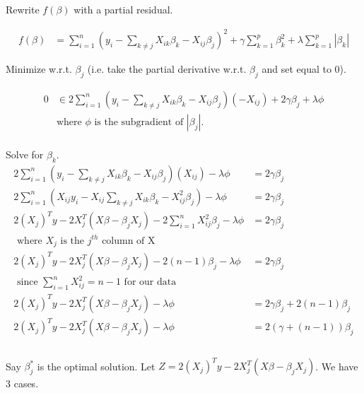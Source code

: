 \documentclass[12pt, reqno]{amsart}
\theoremstyle{definition}
\theoremstyle{remark}
\begin{document}
Rewrite $f(\beta)$ with a partial residual.

\begin{equation*}
\begin{split}
f(\beta) &= \sum_{i = 1}^{n} (y_i - \sum_{k \neq j}^{} X_{ik} \beta_k - X_{ij} \beta_j )^2 + \gamma \sum_{k = 1}^{p} \beta_k^2 + \lambda \sum_{k = 1}^{p} |\beta_k|
\end{split}
\end{equation*}

Minimize w.r.t. $\beta_j$ (i.e. take the partial derivative w.r.t. $\beta_j$ and set equal to $0$).

\begin{equation*}
\begin{split}
0 &\in 2 \sum_{i = 1}^{n} (y_i - \sum_{k \neq j}^{} X_{ik} \beta_k - X_{ij} \beta_j )(-X_{ij}) + 2 \gamma \beta_j + \lambda \phi \\
 & \text{where $\phi$ is the subgradient of $|\beta_j|$.}\\
\end{split}
\end{equation*}


Solve for $\beta_k$.\\
\begin{equation*}
\begin{split}
2 \sum_{i = 1}^{n} (y_i - \sum_{k \neq j}^{} X_{ik} \beta_k - X_{ij} \beta_j )(X_{ij})  - \lambda \phi &= 2 \gamma \beta_j\\
2 \sum_{i = 1}^{n} (X_{ij}y_i - X_{ij}\sum_{k \neq j}^{} X_{ik} \beta_k - X_{ij}^2 \beta_j )  - \lambda \phi &= 2 \gamma \beta_j\\
2 (X_j)^T y - 2 X_j^T (X \beta - \beta_j X_j) - 2\sum_{i = 1}^{n} X_{ij}^2 \beta_j  - \lambda \phi &= 2 \gamma \beta_j\\
\text{ where $X_j$ is the $j^{th}$ column of X} & \\
2 (X_j)^T y - 2 X_j^T (X \beta - \beta_j X_j) - 2(n-1) \beta_j  - \lambda \phi &= 2 \gamma \beta_j\\
\text{ since $\sum_{i = 1}^{n} X_{ij}^2 = n - 1$ for our data} & \\
2 (X_j)^T y - 2 X_j^T (X \beta - \beta_j X_j)  - \lambda \phi &= 2 \gamma \beta_j  + 2(n-1) \beta_j\\
2 (X_j)^T y - 2 X_j^T (X \beta - \beta_j X_j)  - \lambda \phi &= 2 (\gamma + (n-1)) \beta_j\\
\end{split}
\end{equation*}
\hfill \\
Say $\beta_j^*$ is the optimal solution. Let $Z = 2 (X_j)^T y - 2 X_j^T (X \beta - \beta_j X_j)$. We have 3 cases.
\end{document}

